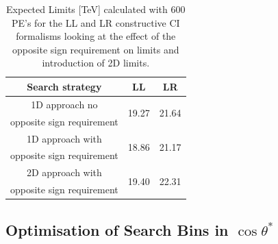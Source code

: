     \begin {table}[h]
        \begin{center}
        \begin{tabular}{ | c | c | c | } 
            \hline
            \hline
            Search strategy & LL & LR \\
            \hline
            1D approach no & \multirow{2}{*}{19.27} & \multirow{2}{*}{21.64} \\
            opposite sign requirement & & \\
            1D approach with & \multirow{2}{*}{18.86} & \multirow{2}{*}{21.17} \\
            opposite sign requirement & & \\
            2D approach with & \multirow{2}{*}{19.40} & \multirow{2}{*}{22.31} \\
            opposite sign requirement & & \\
            \hline
            \hline
        \end{tabular}
        \caption{Expected Limits [TeV] calculated with 600 PE's for the LL and LR constructive CI formalisms looking at the effect of the opposite sign requirement on limits and introduction of 2D limits.}
        \label{tab:limits_oppSign}
        \end{center}
    \end {table}



\subsection{Optimisation of Search Bins in $\cos{\theta^{*}}$}
    \label{sec:binOpp}

